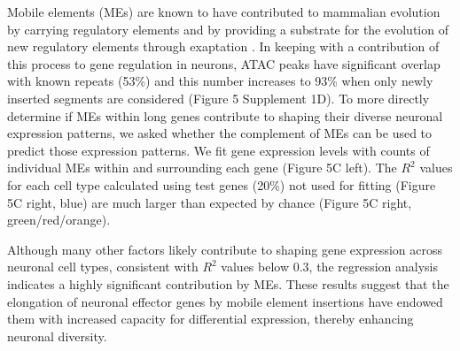 Mobile elements (MEs) are known to have contributed to mammalian evolution by carrying regulatory elements \citep{Johnson_2006,Chuong_2016a} and by providing a substrate for the evolution of new regulatory elements through exaptation \citep{Mikkelsen_2007,Sasaki_2008}. In keeping with a contribution of this process to gene regulation in neurons, ATAC peaks have significant overlap with known repeats (53\%) and this number increases to 93\% when only newly inserted segments are considered (Figure 5 Supplement 1D). To more directly determine if MEs within long genes contribute to shaping their diverse neuronal expression patterns, we asked whether the complement of MEs can be used to predict those expression patterns. We fit gene expression levels with counts of individual MEs within and surrounding each gene (Figure 5C left). The $R^2$ values for each cell type calculated using test genes (20\%) not used for fitting (Figure 5C right, blue) are much larger than expected by chance (Figure 5C right, green/red/orange). %

Although many other factors likely contribute to shaping gene expression across neuronal cell types, consistent with $R^2$ values below 0.3, the regression analysis indicates a highly significant contribution by MEs. These results suggest that the elongation of neuronal effector genes by mobile element insertions have endowed them with increased capacity for differential expression, thereby  enhancing neuronal diversity. 

